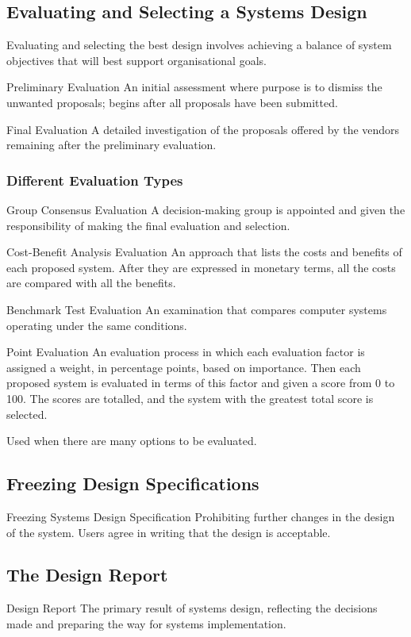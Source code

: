 \documentclass[\main/notes.tex]{subfiles}
\begin{document}
			\subsection{Evaluating and Selecting a Systems Design}
				Evaluating and selecting the best design involves achieving a balance of system objectives that will best support organisational goals.
				\begin{definition}{Preliminary Evaluation}
					An initial assessment where purpose is to dismiss the unwanted proposals; begins after all proposals have been submitted.
				\end{definition}
				\begin{definition}{Final Evaluation}
					A detailed investigation of the proposals offered by the vendors remaining after the preliminary evaluation.
				\end{definition}
				\subsubsection{Different Evaluation Types}
					\begin{definition}{Group Consensus Evaluation}
						A decision-making group is appointed and given the responsibility of making the final evaluation and selection.
					\end{definition}
					\begin{definition}{Cost-Benefit Analysis Evaluation}
						An approach that lists the costs and benefits of each proposed system. After they are expressed in monetary terms, all the costs are compared with all the benefits.
					\end{definition}
					\begin{definition}{Benchmark Test Evaluation}
						An examination that compares computer systems operating under the same conditions.
					\end{definition}
					\begin{definition}{Point Evaluation}
						An evaluation process in which each evaluation factor is assigned a weight, in percentage points, based on importance. Then each proposed system is evaluated in terms of this factor and given a score from 0 to 100. The scores are totalled, and the system with the greatest total score is selected.

						Used when there are many options to be evaluated.
					\end{definition}
			\subsection{Freezing Design Specifications}
				\begin{definition}{Freezing Systems Design Specification}
					Prohibiting further changes in the design of the system. Users agree in writing that the design is acceptable.
				\end{definition}
			\subsection{The Design Report}
				\begin{definition}{Design Report}
					The primary result of systems design, reflecting the decisions made and preparing the way for systems implementation.
				\end{definition}

	\vbox{}
\end{document}
